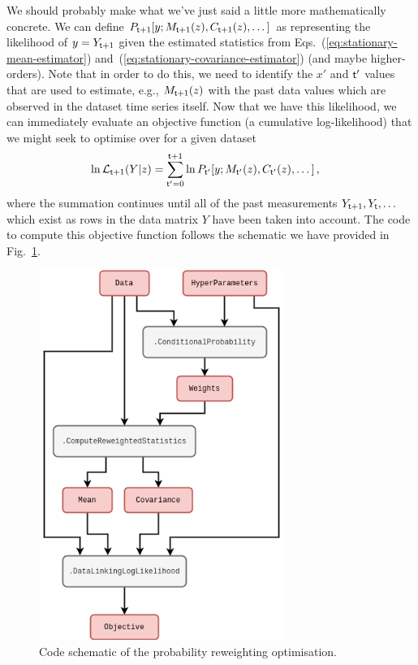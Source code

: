 We should probably make what we've just said a little more mathematically concrete. We can define $P_{{\sf t}+1}[y;M_{{\sf t}+1}(z),C_{{\sf t}+1}(z),\dots ]$ as representing the likelihood of $y = Y_{{\sf t}+1}$ given the estimated statistics from Eqs.~(\ref{eq:stationary-mean-estimator}) and~(\ref{eq:stationary-covariance-estimator}) (and maybe higher-orders). Note that in order to do this, we need to identify the $x'$ and ${\sf t}'$ values that are used to estimate, e.g., $M_{{\sf t}+1}(z)$ with the past data values which are observed in the dataset time series itself. Now that we have this likelihood, we can immediately evaluate an objective function (a cumulative log-likelihood) that we might seek to optimise over for a given dataset 
\begin{align}
\ln {\cal L}_{{\sf t}+1}(Y\vert z) &= \sum_{{\sf t}'=0}^{{\sf t}+1} \ln P_{{\sf t}'}[y;M_{{\sf t}'}(z),C_{{\sf t}'}(z),\dots ] \,, \label{eq:log-likelihood-reweighting}
\end{align}
where the summation continues until all of the past measurements $Y_{{\sf t}+1}, Y_{{\sf t}}, \dots$ which exist as rows in the data matrix $Y$ have been taken into account. The code to compute this objective function follows the schematic we have provided in Fig.~\ref{fig:prob-reweighting-code}.

\begin{figure}[h]
\centering
\includegraphics[width=8cm]{images/chapter-2-prob-reweighting-code.drawio.png}
\caption{Code schematic of the probability reweighting optimisation.}
\label{fig:prob-reweighting-code}
\end{figure} 

